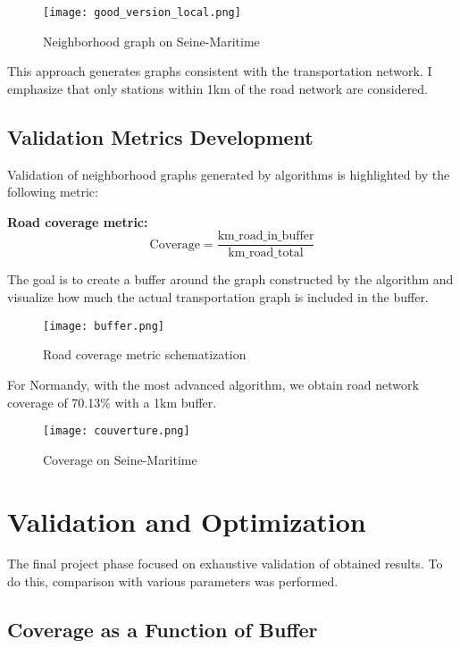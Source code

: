 \documentclass[12pt,a4paper]{report}
\begin{document}
\begin{figure}[h]
    \centering
    \texttt{[image: good\_version\_local.png]}
    \caption{Neighborhood graph on Seine-Maritime}
    \label{fig:image_unique}
\end{figure}

This approach generates graphs consistent with the transportation network. I emphasize that only stations within 1km of the road network are considered.

\subsection{Validation Metrics Development}

Validation of neighborhood graphs generated by algorithms is highlighted by the following metric:

\textbf{Road coverage metric:}
\begin{equation}
\text{Coverage} = \frac{\text{km\_road\_in\_buffer}}{\text{km\_road\_total}}
\end{equation}

The goal is to create a buffer around the graph constructed by the algorithm and visualize how much the actual transportation graph is included in the buffer.

\begin{figure}[h]
    \centering
    \texttt{[image: buffer.png]}
    \caption{Road coverage metric schematization}
    \label{fig:image_unique}
\end{figure}

For Normandy, with the most advanced algorithm, we obtain road network coverage of 70.13\% with a 1km buffer.

\begin{figure}[h]
    \centering
    \texttt{[image: couverture.png]}
    \caption{Coverage on Seine-Maritime}
    \label{fig:image_unique}
\end{figure}

\section{Validation and Optimization}

The final project phase focused on exhaustive validation of obtained results. To do this, comparison with various parameters was performed.

\subsection{Coverage as a Function of Buffer}
\end{document}
